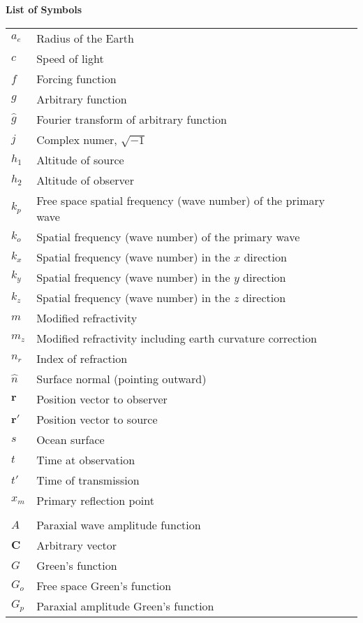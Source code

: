 \noindent\Large{\bf{List of Symbols}}

\vspace{24pt}

\small\normalsize
\begin{supertabular}{ll}
$a_e$ & Radius of the Earth \\
$c$ & Speed of light \\
$f$ & Forcing function \\
$g$ & Arbitrary function \\
$\hat{g}$ & Fourier transform of arbitrary function\\
$j$ & Complex numer, $\sqrt{-1}$ \\
$h_1$ & Altitude of source\\
$h_2$ & Altitude of observer\\
$k_p$ & Free space spatial frequency (wave number) of the primary wave \\
$k_o$ & Spatial frequency (wave number) of the primary wave \\
$k_x$ & Spatial frequency (wave number) in the $x$ direction \\
$k_y$ & Spatial frequency (wave number) in the $y$ direction \\
$k_z$ & Spatial frequency (wave number) in the $z$ direction \\
$m$ & Modified refractivity \\
$m_z$ & Modified refractivity including earth curvature correction\\
$n_r$ & Index of refraction \\
$\hat{n}$ & Surface normal (pointing outward) \\
$\mathbf{r}$ & Position vector to observer \\
$\mathbf{r}'$ & Position vector to source \\
$s$ & Ocean surface \\
$t$ & Time at observation\\
$t'$ & Time of transmission\\
$x_m$ & Primary reflection point \\
\\
$A$ & Paraxial wave amplitude function \\
$\mathbf{C}$ & Arbitrary vector \\
$G$ & Green's function \\
$G_o$ & Free space Green's function \\
$G_p$ & Paraxial amplitude Green’s function \\

\end{supertabular}
